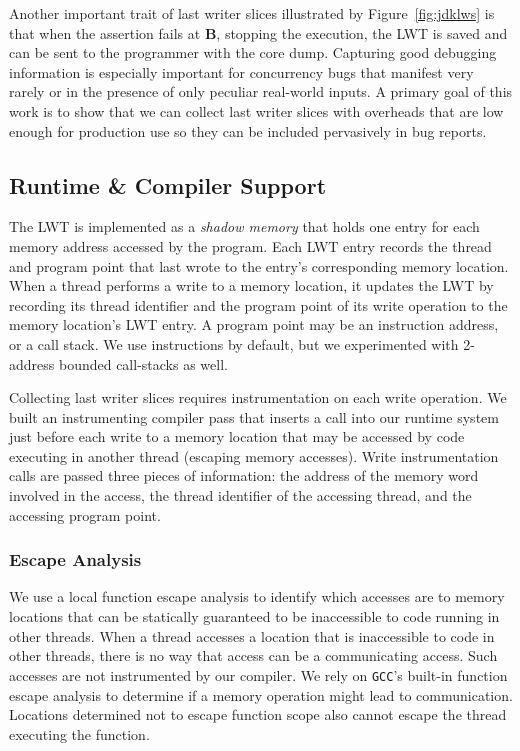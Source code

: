 \documentclass[preprint,9pt]{sigplanconf}
\newcommand{\lwt}{LWT\xspace}
\begin{document}
Another important trait of last writer slices illustrated by
Figure~\ref{fig:jdklws} is that when the assertion fails at {\bf B}, stopping
the execution, the \lwt is saved and can be sent to the programmer with the
core dump.  Capturing good debugging information is especially important for
concurrency bugs that manifest very rarely or in the presence of only peculiar
real-world inputs.  A primary goal of this work is to show that we can collect
last writer slices with overheads that are low enough for production use so
they can be included pervasively in bug reports.


\subsection{Runtime \& Compiler Support}
 The \lwt is implemented as a {\em shadow memory} that holds one entry for
each memory address accessed by the program.  Each \lwt entry records the
thread and program point that last wrote to the entry's corresponding memory
location.  When a thread performs a write to a memory location, it updates the
\lwt by recording its thread identifier and the program point of its write
operation to the memory location's \lwt entry.  A program point may be an
instruction address, or a call stack.  We use instructions by default, but we experimented with 2-address bounded call-stacks as well.   

Collecting last writer slices requires instrumentation on each write operation.
We built an instrumenting compiler pass that inserts a call into our runtime
system just before each write to a memory location that may be accessed by code
executing in another thread (escaping memory accesses).  Write instrumentation
calls are passed three pieces of information: the address of the memory word
involved in the access, the thread identifier of the accessing thread, and the
accessing program point.   

\subsubsection{Escape Analysis}
We use a local function escape analysis to identify which accesses are to
memory locations that can be statically guaranteed to be inaccessible to code
running in other threads.  When a thread accesses a location that is
inaccessible to code in other threads, there is no way that access can be a
communicating access.  Such accesses are not instrumented by our compiler.  
We rely on {\tt GCC}'s built-in function escape analysis to determine if a
memory operation might lead to communication.  Locations determined not to
escape function scope also cannot escape the thread executing the function.
\end{document}
